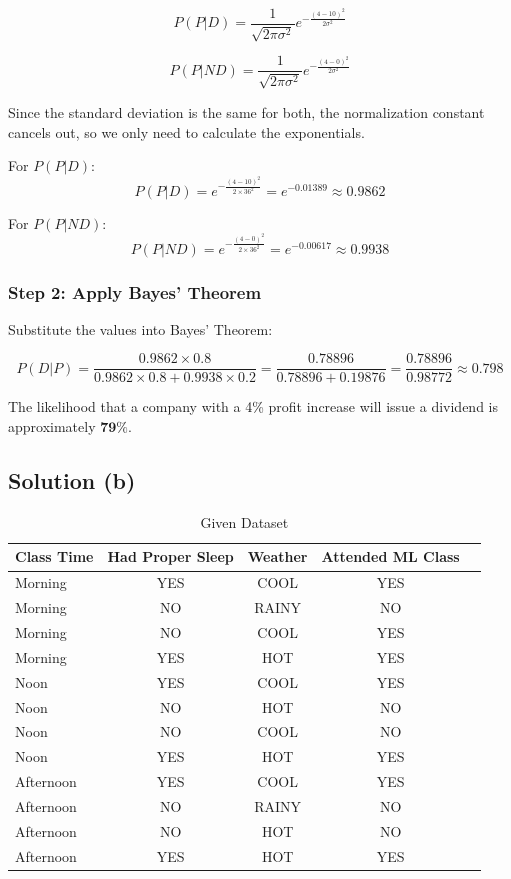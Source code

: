 \documentclass{article}
\begin{document}
\[
P(P | D) = \frac{1}{\sqrt{2\pi\sigma^2}} e^{-\frac{(4 - 10)^2}{2\sigma^2}}
\]

\[
P(P | ND) = \frac{1}{\sqrt{2\pi\sigma^2}} e^{-\frac{(4 - 0)^2}{2\sigma^2}}
\]

\hspace{-17pt}
Since the standard deviation is the same for both, the normalization constant cancels out, so we only need to calculate the exponentials.

\vspace{3pt}
For $P(P | D)$:
\[
P(P | D) = e^{-\frac{(4 - 10)^2}{2 \times 36^2}} = e^{-0.01389} \approx 0.9862
\]

For $P(P | ND)$:
\[
P(P | ND) = e^{-\frac{(4 - 0)^2}{2 \times 36^2}} = e^{-0.00617} \approx 0.9938
\]

\subsubsection*{Step 2: Apply Bayes' Theorem}

Substitute the values into Bayes' Theorem:

\[
P(D | P) = \frac{0.9862 \times 0.8}{0.9862 \times 0.8 + 0.9938 \times 0.2} = \frac{0.78896}{0.78896 + 0.19876} = \frac{0.78896}{0.98772} \approx 0.798
\]

\vspace{10pt}
\hspace{-17pt}
The likelihood that a company with a 4\% profit increase will issue a dividend is approximately $\mathbf{79\%}$.


\vspace{10pt}
\subsection*{Solution (b)}
\begin{table}[H]
    \centering
    \begin{tabular}{|l|c|c|c|c|}
        \hline
        \textbf{Class Time} & \textbf{Had Proper Sleep} & \textbf{Weather} & \textbf{Attended ML Class} \\ \hline
        Morning & YES & COOL & YES \\ \hline
        Morning & NO & RAINY & NO \\ \hline
        Morning & NO & COOL & YES \\ \hline
        Morning & YES & HOT & YES \\ \hline
        Noon & YES & COOL & YES \\ \hline
        Noon & NO & HOT & NO \\ \hline
        Noon & NO & COOL & NO \\ \hline
        Noon & YES & HOT & YES \\ \hline
        Afternoon & YES & COOL & YES \\ \hline
        Afternoon & NO & RAINY & NO \\ \hline
        Afternoon & NO & HOT & NO \\ \hline
        Afternoon & YES & HOT & YES \\ \hline
    \end{tabular}
    \caption{Given Dataset}
\end{table}
\end{document}
